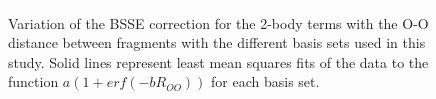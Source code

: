 \documentclass[11pt, proquest]{uwthesis}[2020/02/24]
\begin{document}
\begin{figure}[t]
\uwsinglespace
\begin{center}
\includegraphics[width=\textwidth]{Figures/Chapter_2/2body_bsse_decay_with_basis.pdf}
\end{center}
\label{fig:MBE_I_F9}
\caption[temp]{Variation of the BSSE correction for the 2-body terms with the O-O distance between fragments with the different basis sets used in this study. Solid lines represent least mean squares fits of the data to the function $a(1+erf(-bR_{OO}))$ for each basis set.}
\end{figure}
\end{document}
